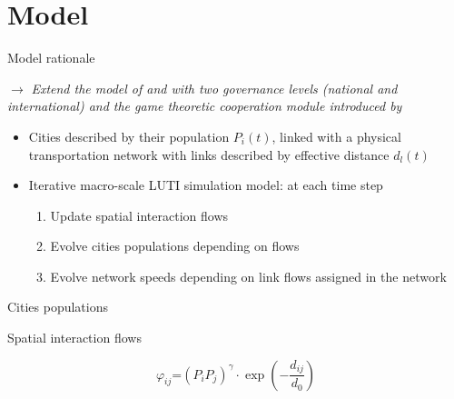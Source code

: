\documentclass[12pt]{iopart}
\begin{document}
\section{Model}


Model rationale




$\rightarrow$ \textit{Extend the model of \cite{raimbault2020hierarchy} and \cite{raimbault2020modeling} with two governance levels (national and international) and the game theoretic cooperation module introduced by \cite{le2015modeling}}

\bigskip

\begin{itemize}
	\item Cities described by their population $P_i\left(t\right)$, linked with a physical transportation network with links described by effective distance $d_l\left(t\right)$
\end{itemize}
\begin{itemize}
	\item Iterative macro-scale LUTI simulation model: at each time step
		\begin{enumerate}
			\item Update spatial interaction flows
			\item Evolve cities populations depending on flows
			\item Evolve network speeds depending on link flows assigned in the network
		\end{enumerate}
\end{itemize}




Cities populations


Spatial interaction flows

\[
\varphi_{ij} \textrm{=} \left( P_i P_j \right)^{\gamma} \cdot \exp\left(- \frac{d_{ij}}{d_0}\right)
\]

\end{document}

